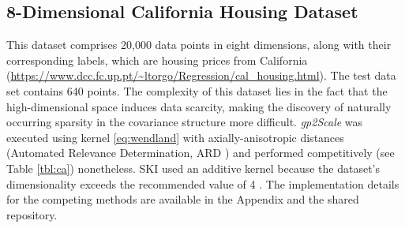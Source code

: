\documentclass{article}
\begin{document}
\subsection{8-Dimensional California Housing Dataset}
This dataset comprises 20,000 data points in eight dimensions, along with their corresponding labels, which are housing prices from California (\url{https://www.dcc.fc.up.pt/~ltorgo/Regression/cal_housing.html}). The test data set contains 640 points. The complexity of this dataset lies in the fact that the high-dimensional space induces data scarcity, making the discovery of naturally occurring sparsity in the covariance structure more difficult. \emph{gp2Scale} was executed using kernel \eqref{eq:wendland} with axially-anisotropic distances (Automated Relevance Determination, ARD \citep{williams1995gaussian}) and performed competitively (see Table \ref{tbl:ca}) nonetheless. SKI used an additive kernel because the dataset's dimensionality exceeds the recommended value of 4 \citep{wilson2015kernel}. 
The implementation details for the competing methods are available in the Appendix and the shared repository.
\end{document}
